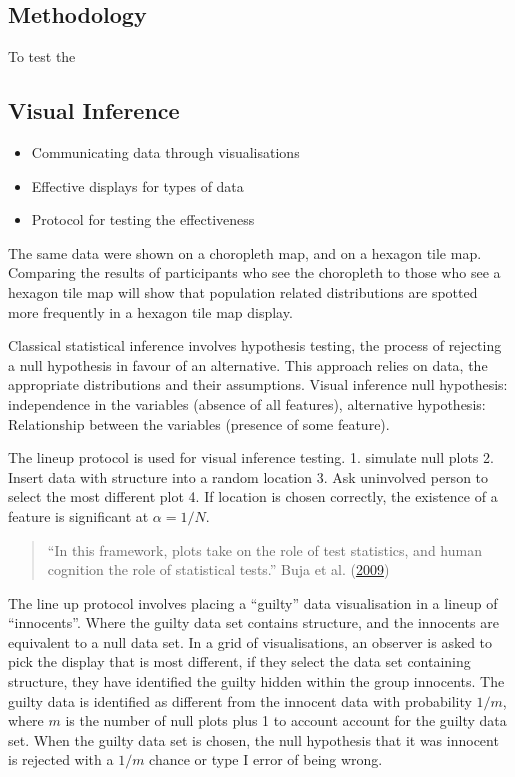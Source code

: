 \documentclass[conference,final,]{IEEEtran}
\providecommand{\tightlist}{%
  \setlength{\itemsep}{0pt}\setlength{\parskip}{0pt}}
\begin{document}
\hypertarget{methodology}{%
\subsection{Methodology}\label{methodology}}

To test the

\hypertarget{visual-inference}{%
\subsection{Visual Inference}\label{visual-inference}}

\begin{itemize}
\tightlist
\item
  Communicating data through visualisations
\item
  Effective displays for types of data
\item
  Protocol for testing the effectiveness
\end{itemize}

The same data were shown on a choropleth map, and on a hexagon tile map.
Comparing the results of participants who see the choropleth to those
who see a hexagon tile map will show that population related
distributions are spotted more frequently in a hexagon tile map display.

Classical statistical inference involves hypothesis testing, the process
of rejecting a null hypothesis in favour of an alternative. This
approach relies on data, the appropriate distributions and their
assumptions. Visual inference null hypothesis: independence in the
variables (absence of all features), alternative hypothesis:
Relationship between the variables (presence of some feature).

The lineup protocol is used for visual inference testing. 1. simulate
null plots 2. Insert data with structure into a random location 3. Ask
uninvolved person to select the most different plot 4. If location is
chosen correctly, the existence of a feature is significant at
\(\alpha = 1/N\).

\begin{quote}
``In this framework, plots take on the role of test statistics, and
human cognition the role of statistical tests.'' Buja et al.
(\protect\hyperlink{ref-SIEDAMD}{2009})
\end{quote}

The line up protocol involves placing a ``guilty'' data visualisation in
a lineup of ``innocents''. Where the guilty data set contains structure,
and the innocents are equivalent to a null data set. In a grid of
visualisations, an observer is asked to pick the display that is most
different, if they select the data set containing structure, they have
identified the guilty hidden within the group innocents. The guilty data
is identified as different from the innocent data with probability
\(1/m\), where \(m\) is the number of null plots plus 1 to account
account for the guilty data set. When the guilty data set is chosen, the
null hypothesis that it was innocent is rejected with a \(1/m\) chance
or type I error of being wrong.
\end{document}
